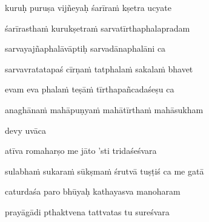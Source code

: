 kuruḥ puruṣa vijñeyaḥ śarīraṁ kṣetra ucyate\thinspace{\dandab} \dontdisplaylinenum

śarīrasthaṁ kurukṣetraṁ sarvatīrthaphalapradam \veg\dontdisplaylinenum
{}

sarvayajñaphalāvāptiḥ sarvadānaphalāni ca\thinspace{\dandab} \dontdisplaylinenum

sarvavratatapaś cīrṇaṁ tatphalaṁ sakalaṁ bhavet \veg\dontdisplaylinenum
{}

evam eva phalaṁ teṣāṁ tīrthapañcadaśeṣu ca\thinspace{\dandab} \dontdisplaylinenum

anaghānaṁ mahāpuṇyaṁ mahātīrthaṁ mahāsukham \veg\dontdisplaylinenum
{}

devy uvāca~{\dandab}\dontdisplaylinenum 

atīva romaharṣo me jāto 'sti tridaśeśvara\thinspace{\danda} \dontdisplaylinenum

sulabhaṁ sukaraṁ sūkṣmaṁ śrutvā tuṣṭiś ca me gatā \veg\dontdisplaylinenum
{}

caturdaśa paro bhūyaḥ kathayasva manoharam\thinspace{\dandab} \dontdisplaylinenum

prayāgādi pthaktvena tattvatas tu sureśvara \veg\dontdisplaylinenum



